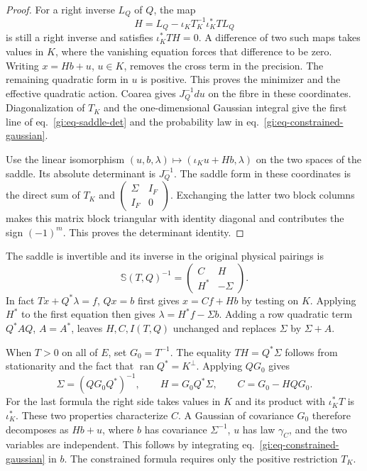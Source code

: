 \documentclass[11pt,letterpaper,reqno]{amsart}
\numberwithin{equation}{section}
\renewcommand{\eqref}[1]{\textup{eq.~\ref{#1}}}
\theoremstyle{definition}
\theoremstyle{remark}
\begin{document}
\begin{proof}
For a right inverse \(L_Q\) of \(Q\), the map
\[
 H=L_Q-\iota_K T_K^{-1}\iota_K^*TL_Q
\]
is still a right inverse and satisfies \(\iota_K^*TH=0\).
A difference of two such maps takes values in \(K\), where
the vanishing equation forces that difference to be zero.
Writing \(x=Hb+u\), \(u\in K\), removes the cross term in
the precision. The remaining quadratic form in \(u\) is
positive. This proves the minimizer and the effective
quadratic action. Coarea gives \(J_Q^{-1}du\) on the
fibre in these coordinates. Diagonalization of \(T_K\)
and the one-dimensional Gaussian integral give the first
line of \eqref{gi:eq-saddle-det} and the probability law
in \eqref{gi:eq-constrained-gaussian}.

Use the linear isomorphism
\((u,b,\lambda)\mapsto(\iota_Ku+Hb,\lambda)\)
on the two spaces of the saddle. Its absolute determinant is
\(J_Q^{-1}\). The saddle form in these coordinates is the
direct sum of \(T_K\) and
\(\begin{pmatrix}\Sigma&I_F\\I_F&0\end{pmatrix}\).
Exchanging the latter two block columns makes this matrix
block triangular with identity diagonal and contributes
the sign \((-1)^m\). This proves the determinant identity.
\end{proof}

The saddle is invertible and its inverse in the original
physical pairings is
\begin{equation}\label{gi:eq-saddle-inverse}
             \mathbb S(T,Q)^{-1}
                      =\begin{pmatrix}C&H\\H^*&-\Sigma\end{pmatrix}.
\end{equation}
In fact \(Tx+Q^*\lambda=f\), \(Qx=b\) first gives \(x=Cf+Hb\)
by testing on \(K\). Applying \(H^*\) to the first equation
then gives \(\lambda=H^*f-\Sigma b\). Adding a row quadratic
term \(Q^*A Q\), \(A=A^*\), leaves \(H,C,I(T,Q)\) unchanged
and replaces \(\Sigma\) by \(\Sigma+A\).

When \(T>0\) on all of \(E\), set \(G_0=T^{-1}\).
The equality \(TH=Q^*\Sigma\) follows from stationarity and
the fact that \(\operatorname{ran}Q^*=K^\perp\). Applying
\(QG_0\) gives
\begin{equation}\label{gi:eq-positive-schur}
 \Sigma=(QG_0Q^*)^{-1},\qquad
 H=G_0Q^*\Sigma,\qquad C=G_0-HQG_0 .
\end{equation}
For the last formula the right side takes values in \(K\)
and its product with \(\iota_K^*T\) is \(\iota_K^*\).
These two properties characterize \(C\). A Gaussian of covariance \(G_0\)
therefore decomposes as \(Hb+u\), where \(b\) has covariance
\(\Sigma^{-1}\), \(u\) has law \(\gamma_C\), and the two
variables are independent. This follows by integrating
\eqref{gi:eq-constrained-gaussian} in \(b\). The constrained
formula requires only the positive restriction \(T_K\).
\end{document}

